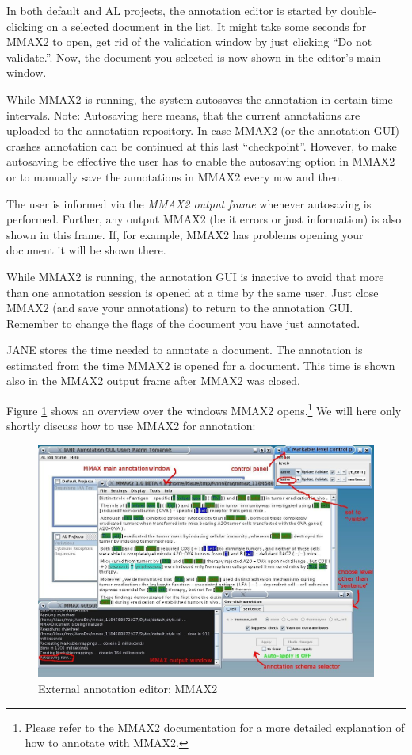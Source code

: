 \documentclass[DIV12,english,11pt,halfparskip]{scrartcl}
\begin{document}
In both default and AL projects, the annotation editor is started by
double-clicking on a selected document in the list. It might take some
seconds for MMAX2 to open, get rid of the validation window by just
clicking ``Do not validate.''. Now, the document you selected is now
shown in the editor's main window. 

While MMAX2 is running, the system autosaves the annotation in certain
time intervals. Note: Autosaving here means, that the current
annotations are uploaded to the annotation repository. In case MMAX2
(or the annotation GUI) crashes annotation can be continued at this
last ``checkpoint''. However, to make autosaving be effective the user
has to enable the autosaving option in MMAX2 or to manually save the
annotations in MMAX2 every now and then.

The user is informed via the \emph{MMAX2 output frame} whenever
autosaving is performed.  Further, any output MMAX2 (be it errors or
just information) is also shown in this frame. If, for example, MMAX2
has problems opening your document it will be shown there. 

While MMAX2 is running, the annotation GUI is inactive to avoid that
more than one annotation session is opened at a time by the same
user. Just close MMAX2 (and save your annotations) to return to the
annotation GUI. Remember to change the flags of the document you have
just annotated.

JANE stores the time needed to annotate a document. The annotation is
estimated from the time MMAX2 is opened for a document. This time is
shown also in the MMAX2 output frame after MMAX2 was closed.

Figure \ref{fig:mmax} shows an overview over the windows MMAX2
opens.\footnote{Please refer to the MMAX2 documentation for a more
  detailed explanation of how to annotate with MMAX2.} We will here
only shortly discuss how to use MMAX2 for annotation:

\begin{figure}[tb]
  \centering
  \includegraphics[scale=0.4]{figs/MMAX2.jpg}
  \caption{External annotation editor: MMAX2}
  \label{fig:mmax}
\end{figure}
\end{document}
